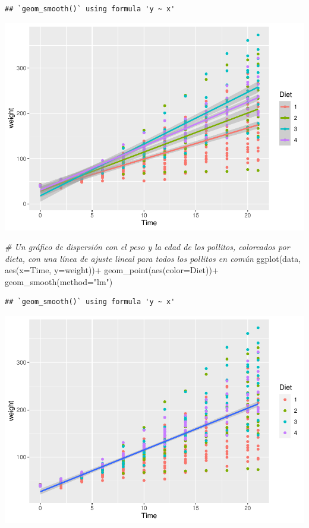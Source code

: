 \documentclass[
]{book}
\newenvironment{Shaded}{\begin{snugshade}}{\end{snugshade}}
\newcommand{\AttributeTok}[1]{\textcolor[rgb]{0.77,0.63,0.00}{#1}}
\newcommand{\CommentTok}[1]{\textcolor[rgb]{0.56,0.35,0.01}{\textit{#1}}}
\newcommand{\FunctionTok}[1]{\textcolor[rgb]{0.00,0.00,0.00}{#1}}
\newcommand{\NormalTok}[1]{#1}
\newcommand{\SpecialCharTok}[1]{\textcolor[rgb]{0.00,0.00,0.00}{#1}}
\newcommand{\StringTok}[1]{\textcolor[rgb]{0.31,0.60,0.02}{#1}}
\begin{document}
\begin{verbatim}
## `geom_smooth()` using formula 'y ~ x'
\end{verbatim}

\includegraphics{Esatadistica_en_R_files/figure-latex/unnamed-chunk-154-4.pdf}

\begin{Shaded}
\begin{Highlighting}[]
\CommentTok{\#  Un gráfico de dispersión con el peso y la edad de los pollitos, coloreados por dieta, con una línea de ajuste lineal para todos los pollitos en común}
\FunctionTok{ggplot}\NormalTok{(data, }\FunctionTok{aes}\NormalTok{(}\AttributeTok{x=}\NormalTok{Time, }\AttributeTok{y=}\NormalTok{weight))}\SpecialCharTok{+}
  \FunctionTok{geom\_point}\NormalTok{(}\FunctionTok{aes}\NormalTok{(}\AttributeTok{color=}\NormalTok{Diet))}\SpecialCharTok{+}
  \FunctionTok{geom\_smooth}\NormalTok{(}\AttributeTok{method=}\StringTok{"lm"}\NormalTok{)}
\end{Highlighting}
\end{Shaded}

\begin{verbatim}
## `geom_smooth()` using formula 'y ~ x'
\end{verbatim}

\includegraphics{Esatadistica_en_R_files/figure-latex/unnamed-chunk-154-5.pdf}
\end{document}
